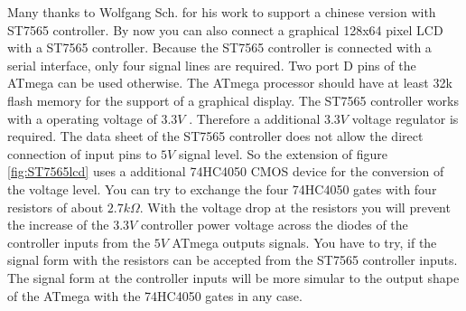 Many thanks to Wolfgang Sch. for his work to support a chinese version with ST7565 controller.
By now you can also connect a graphical 128x64 pixel LCD with a ST7565 controller.
Because the ST7565 controller is connected with a serial interface, only four signal
lines are required. Two port D pins of the ATmega can be used otherwise.
The ATmega processor should have at least 32k flash memory for the support of a graphical display.
The ST7565 controller works with a operating voltage of \(3.3V\) .
Therefore a additional \(3.3V\) voltage regulator is required.
The data sheet of the ST7565 controller does not allow the direct connection of input pins to
\(5V\) signal level. So the extension of figure \ref{fig:ST7565lcd} uses a additional 74HC4050 CMOS
device for the conversion of the voltage level.
You can try to exchange the four 74HC4050 gates with four resistors of about \(2.7k\Omega\).
With the voltage drop at the resistors you will prevent the increase of the \(3.3V\) controller power voltage 
across the diodes of the controller inputs from the \(5V\) ATmega outputs signals.
You have to try, if the signal form with the resistors can be accepted from the ST7565 controller inputs.
The signal form at the controller inputs will be more simular to the output shape of the ATmega with the 74HC4050 gates in any case.\\

